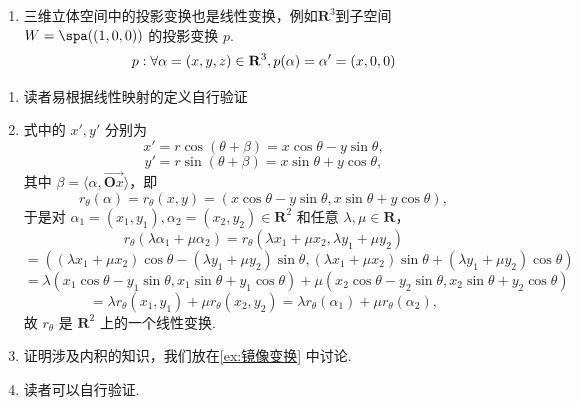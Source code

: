 \begin{example}{}{}
\begin{enumerate}
\begin{center}
        \end{center}
        \item 三维立体空间中的投影变换也是线性变换，例如$\mathbf{R}^3$到子空间 $W=\spa((1,0,0))$ 的投影变换 $p$.
        \[
        p: \forall \alpha = (x,y,z) \in \mathbf{R}^3,\\
        p(\alpha) = \alpha'= (x,0,0)
        \]
    \end{enumerate}

\end{example}

\begin{solution}
    \begin{enumerate}
     \item 读者易根据线性映射的定义自行验证
     \item 式中的 \( x', y' \) 分别为
     \[
     x' = r \cos(\theta + \beta) = x \cos \theta - y \sin \theta,
     \]
     \[
     y' = r \sin(\theta + \beta) = x \sin \theta + y \cos \theta,
     \]
     其中 \( \beta = \langle \alpha, \vec{\mathbf{O}x} \rangle \)，即
     \[
     r_{\theta}(\alpha) = r_{\theta}(x, y) = (x \cos \theta - y \sin \theta, x \sin \theta + y \cos \theta),
     \]
     于是对 \( \alpha_1 = (x_1, y_1), \alpha_2 = (x_2, y_2) \in \mathbf{R}^2 \) 和任意 \( \lambda, \mu \in \mathbf{R} \)，
     \[
     r_{\theta}(\lambda \alpha_1 + \mu \alpha_2) = r_{\theta}(\lambda x_1 + \mu x_2, \lambda y_1 + \mu y_2)
     \]
     \[
     = ((\lambda x_1 + \mu x_2) \cos \theta - (\lambda y_1 + \mu y_2) \sin \theta,
     (\lambda x_1 + \mu x_2) \sin \theta + (\lambda y_1 + \mu y_2) \cos \theta)
     \]
     \[
     = \lambda (x_1 \cos \theta - y_1 \sin \theta, x_1 \sin \theta + y_1 \cos \theta)
     + \mu (x_2 \cos \theta - y_2 \sin \theta, x_2 \sin \theta + y_2 \cos \theta)
     \]
     \[
     = \lambda r_{\theta}(x_1, y_1) + \mu r_{\theta}(x_2, y_2) = \lambda r_{\theta}(\alpha_1) + \mu r_{\theta}(\alpha_2),
     \]
     故 \( r_{\theta} \) 是 \( \mathbf{R}^2 \) 上的一个线性变换.

    \item 证明涉及内积的知识，我们放在\autoref{ex:镜像变换} 中讨论.
    \item 读者可以自行验证.
    \end{enumerate}

\end{solution}

